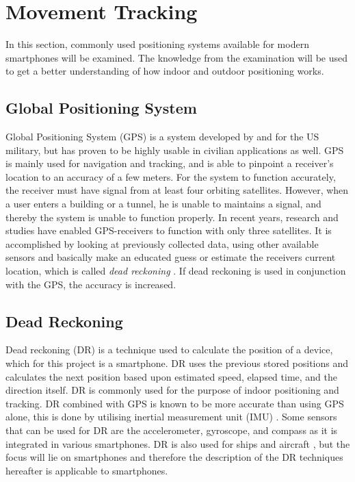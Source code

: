\section{Movement Tracking} \label{section:movement-tracking}
In this section, commonly used positioning systems available for modern smartphones will be examined. 
The knowledge from the examination will be used to get a better understanding of how indoor and outdoor positioning works.

\subsection{Global Positioning System} \label{section:gps}
Global Positioning System (GPS) is a system developed by and for the US military, but has proven to be highly usable in civilian applications as well. 
GPS is mainly used for navigation and tracking, and is able to pinpoint a receiver's location to an accuracy of a few meters.
For the system to function accurately, the receiver must have signal from at least four orbiting satellites. 
However, when a user enters a building or a tunnel, he is unable to maintains a signal, and thereby the system is unable to function properly.
In recent years, research and studies have enabled GPS-receivers to function with only three satellites. 
It is accomplished by looking at previously collected data, using other available sensors and basically make an educated guess or estimate the receivers current location, which is called \textit{dead reckoning} \citep{Misc:WhatIsGPS}. 
If dead reckoning is used in conjunction with the GPS, the accuracy is increased. \citep{Article:JesseDeadReckoning, Article:PedestrianDR, PhdThesis:IndoorLocalization, Article:DRParameterCorrection}

\subsection{Dead Reckoning}\label{section:dead-reckoning}
Dead reckoning (DR) is a technique used to calculate the position of a device, which for this project is a smartphone.
DR uses the previous stored positions and calculates the next position based upon estimated speed, elapsed time, and the direction itself. 
DR is commonly used for the purpose of indoor positioning and tracking. 
DR combined with GPS is known to be more accurate than using GPS alone, this is done by utilising inertial measurement unit (IMU) \citep{Article:WirelessAssistedPDR, Article:PedestrianNavigationSystem}.
Some sensors that can be used for DR are the accelerometer, gyroscope, and compass as it is integrated in various smartphones. 
DR is also used for ships and aircraft \citep{Misc:DRBritannica}, but the focus will lie on smartphones and therefore the description of the DR techniques hereafter is applicable to smartphones.

